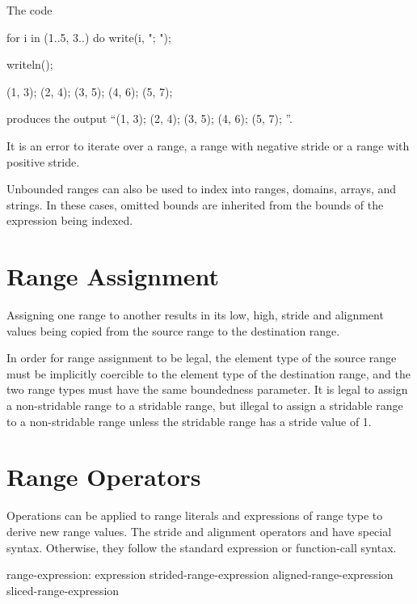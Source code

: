 \begin{example}
The code
\begin{chapelpre}
\end{chapelpre}
\begin{chapel}
for i in (1..5, 3..) do
  write(i, "; ");
\end{chapel}
\begin{chapelpost}
writeln();
\end{chapelpost}
\begin{chapeloutput}
(1, 3); (2, 4); (3, 5); (4, 6); (5, 7); 
\end{chapeloutput}
produces the output ``(1, 3); (2, 4); (3, 5); (4, 6); (5, 7); ''.
\end{example}

It is an error to iterate over a  range,
a  range with negative stride or a
 range with positive stride.

Unbounded ranges can also be used to index into ranges, domains,
arrays, and strings.  In these cases, omitted bounds are inherited
from the bounds of the expression being indexed.


\section{Range Assignment}
\label{Range_Assignment}

Assigning one range to another results in its low, high, stride and alignment
values being copied from the source range to the destination range.

In order for range assignment to be legal, the element type of the
source range must be implicitly coercible to the element type of the
destination range, and the two range types must have the same boundedness
parameter.  It is legal to assign a non-stridable range to a stridable
range, but illegal to assign a stridable range to a non-stridable
range unless the stridable range has a stride value of 1.


\section{Range Operators}
\label{Range_Operators}

Operations can be applied to range literals and expressions of range type to
derive new range values.  The stride and alignment operators 
and  have special syntax.  Otherwise, they follow the standard
expression or function-call syntax.
\begin{syntax}
range-expression:
  expression
  strided-range-expression
  aligned-range-expression
  sliced-range-expression
\end{syntax}

